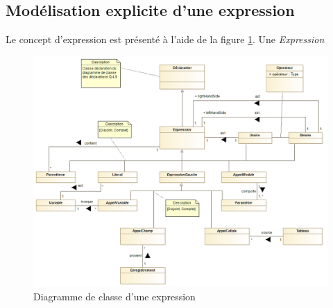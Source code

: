 
\subsection{Modélisation explicite d'une expression}
\label{sec:question9}

Le concept d'expression est présenté à l'aide de la figure \ref{fig:expression}. Une \emph{Expression} 

\begin{figure}
	\centering
	\includegraphics[width=500pt]{assets/class__Expression}
	\caption{Diagramme de classe d'une expression}
	\label{fig:expression}
\end{figure}